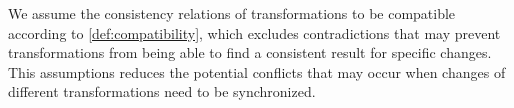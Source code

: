 We assume the consistency relations of transformations to be compatible according to \autoref{def:compatibility}, which excludes contradictions that may prevent transformations from being able to find a consistent result for specific changes.
This assumptions reduces the potential conflicts that may occur when changes of different transformations need to be synchronized.


